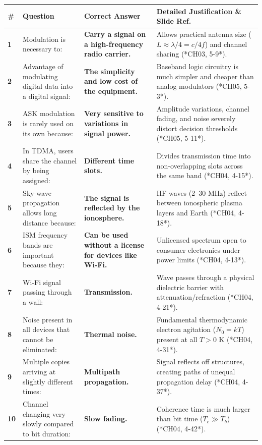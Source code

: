 \documentclass[10pt,a4paper]{article}
\begin{document}
\begin{center}
\small
\begin{tabular}{p{0.5cm} p{6.8cm} p{4.2cm} p{5.5cm}}
\toprule
\rowcolor{lightbg}
\textbf{\#} & \textbf{Question} & \textbf{Correct Answer} & \textbf{Detailed Justification \& Slide Ref.} \\
\midrule
\textbf{1} & Modulation is necessary to: & \textbf{Carry a signal on a high-frequency radio carrier.} & Allows practical antenna size ($L \approx \lambda/4 = c/4f$) and channel sharing (*CH03, 5-9*). \\
\textbf{2} & Advantage of modulating digital data into a digital signal: & \textbf{The simplicity and low cost of the equipment.} & Baseband logic circuitry is much simpler and cheaper than analog modulators (*CH05, 5-3*). \\
\textbf{3} & ASK modulation is rarely used on its own because: & \textbf{Very sensitive to variations in signal power.} & Amplitude variations, channel fading, and noise severely distort decision thresholds (*CH05, 5-11*). \\
\textbf{4} & In TDMA, users share the channel by being assigned: & \textbf{Different time slots.} & Divides transmission time into non-overlapping slots across the same band (*CH04, 4-15*). \\
\textbf{5} & Sky-wave propagation allows long distance because: & \textbf{The signal is reflected by the ionosphere.} & HF waves (2--30 MHz) reflect between ionospheric plasma layers and Earth (*CH04, 4-18*). \\
\textbf{6} & ISM frequency bands are important because they: & \textbf{Can be used without a license for devices like Wi-Fi.} & Unlicensed spectrum open to consumer electronics under power limits (*CH04, 4-13*). \\
\textbf{7} & Wi-Fi signal passing through a wall: & \textbf{Transmission.} & Wave passes through a physical dielectric barrier with attenuation/refraction (*CH04, 4-21*). \\
\textbf{8} & Noise present in all devices that cannot be eliminated: & \textbf{Thermal noise.} & Fundamental thermodynamic electron agitation ($N_0 = kT$) present at all $T > 0$ K (*CH04, 4-31*). \\
\textbf{9} & Multiple copies arriving at slightly different times: & \textbf{Multipath propagation.} & Signal reflects off structures, creating paths of unequal propagation delay (*CH04, 4-37*). \\
\textbf{10} & Channel changing very slowly compared to bit duration: & \textbf{Slow fading.} & Coherence time is much larger than bit time ($T_c \gg T_b$) (*CH04, 4-42*). \\

\end{tabular}
\end{center}
\end{document}

